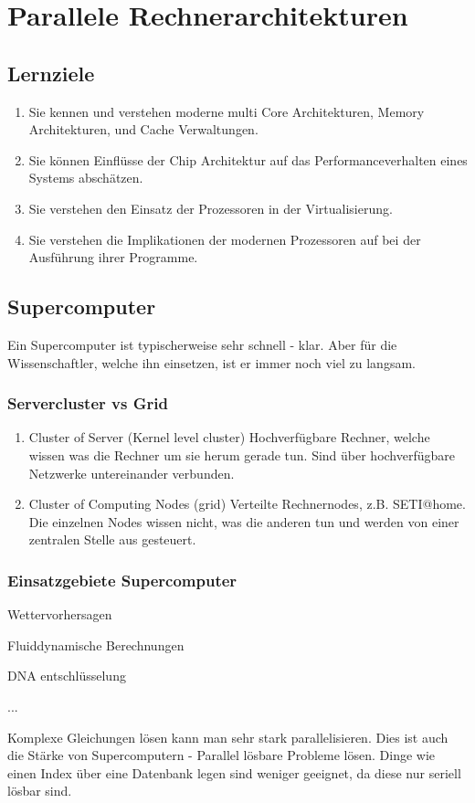 \chapter{Parallele Rechnerarchitekturen}
\section{Lernziele}
\begin{enumerate}
	\item Sie kennen und verstehen moderne multi Core Architekturen, Memory Architekturen, und Cache Verwaltungen.
	\item Sie können Einflüsse der Chip Architektur auf das	Performanceverhalten eines Systems abschätzen.
	\item Sie verstehen den Einsatz der Prozessoren in der Virtualisierung.
	\item Sie verstehen die Implikationen der modernen Prozessoren auf bei der Ausführung ihrer Programme.
\end{enumerate}
\section{Supercomputer}
Ein Supercomputer ist typischerweise sehr schnell - klar. Aber für die Wissenschaftler, welche ihn einsetzen, ist er immer noch viel zu langsam.
\subsection{Servercluster vs Grid}
\begin{enumerate}
	\item Cluster of Server (Kernel level cluster)
		\subitem Hochverfügbare Rechner, welche wissen was die Rechner um sie herum gerade tun. Sind über hochverfügbare Netzwerke untereinander verbunden.
	\item Cluster of Computing Nodes (grid)
		\subitem Verteilte Rechnernodes, z.B. SETI@home. Die einzelnen Nodes wissen nicht, was die anderen tun und werden von einer zentralen Stelle aus gesteuert.
\end{enumerate}
\subsection{Einsatzgebiete Supercomputer}
\begin{enumeration}
	\item Wettervorhersagen
	\item Fluiddynamische Berechnungen
	\item DNA entschlüsselung
	\item ...
\end{enumeration}
Komplexe Gleichungen lösen kann man sehr stark parallelisieren. Dies ist auch die Stärke von Supercomputern - Parallel lösbare Probleme lösen. Dinge wie einen Index über eine Datenbank legen sind weniger geeignet, da diese nur seriell lösbar sind.
